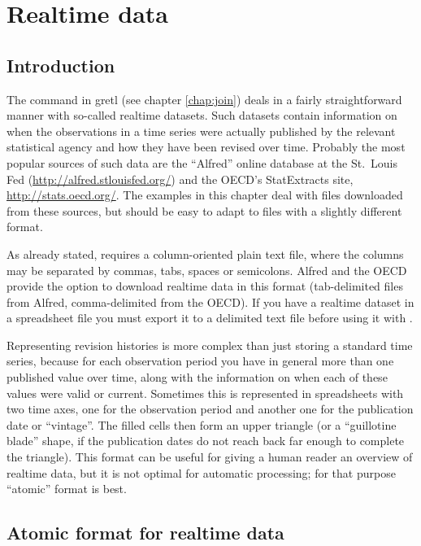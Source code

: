\chapter{Realtime data}
\label{chap:realtime}

\section{Introduction}
\label{sec:realtime-intro}

The  command in gretl (see chapter \ref{chap:join}) deals in
a fairly straightforward manner with so-called realtime datasets.
Such datasets contain information on when the observations in a time
series were actually published by the relevant statistical agency and
how they have been revised over time. Probably the most popular
sources of such data are the ``Alfred'' online database at the St.\
Louis Fed (\url{http://alfred.stlouisfed.org/}) and the OECD's
\textsf{StatExtracts} site, \url{http://stats.oecd.org/}.  The
examples in this chapter deal with files downloaded from these
sources, but should be easy to adapt to files with a slightly
different format.

As already stated,  requires a column-oriented plain text
file, where the columns may be separated by commas, tabs, spaces or
semicolons. Alfred and the OECD provide the option to download
realtime data in this format (tab-delimited files from Alfred,
comma-delimited from the OECD). If you have a realtime dataset in a
spreadsheet file you must export it to a delimited text file before
using it with \cmd{join}.

Representing revision histories is more complex than just storing a
standard time series, because for each observation period you have in
general more than one published value over time, along with the
information on when each of these values were valid or
current. Sometimes this is represented in spreadsheets with two time
axes, one for the observation period and another one for the
publication date or ``vintage''. The filled cells then form an upper
triangle (or a ``guillotine blade'' shape, if the publication dates do
not reach back far enough to complete the triangle). This format can
be useful for giving a human reader an overview of realtime data, but
it is not optimal for automatic processing; for that purpose
``atomic'' format is best.

\section{Atomic format for realtime data}
\label{sec:realtime-atomic}

